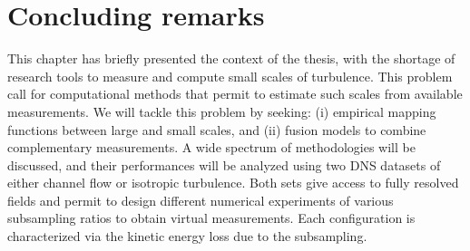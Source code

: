 \section{Concluding remarks}
This chapter has briefly presented the context of the thesis, with the shortage of research tools to measure and compute small scales of turbulence. This problem call for computational methods that permit to estimate such scales from available measurements. We will tackle this problem by seeking: (i) empirical mapping functions between large and small scales, and (ii) fusion models to combine complementary measurements. A wide spectrum of methodologies will be discussed, and their performances will be analyzed using two DNS datasets of either channel flow or isotropic turbulence. Both sets give access to fully resolved fields and permit to design different numerical experiments of various subsampling ratios to obtain virtual measurements. Each configuration is characterized via the kinetic energy loss due to the subsampling. 